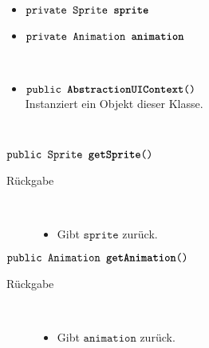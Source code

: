 \begin{description}
\item[Beschreibung] \hfill \\ 
\item[Attribute] \hfill \\
	\vspace{-.8cm}
	\begin{itemize}	
		\item $\texttt{private Sprite \textbf{sprite}}$ \\ 		
		\item $\texttt{private Animation \textbf{animation}}$ \\ 
		\end{itemize}
	
\item[Konstruktoren] \hfill \\
	\vspace{-.8cm}
	\begin{itemize}
		\item $\texttt{public \textbf{AbstractionUIContext}()}$ \\ Instanziert ein Objekt dieser Klasse.

	\end{itemize}
	
\item[Methoden] \hfill \\
	\vspace{-.8cm}
		\item $\texttt{public Sprite \textbf{getSprite}()}$ \\ 
		\begin{description}
			\item[Rückgabe] \hfill \\
			\vspace{-.8cm}
			\begin{itemize}
				\item Gibt $\texttt{sprite}$ zurück.
			\end{itemize}
			\end{description}
			
		\item $\texttt{public Animation \textbf{getAnimation}()}$ \\ 
		\begin{description}
			\item[Rückgabe] \hfill \\
			\vspace{-.8cm}
			\begin{itemize}
				\item Gibt $\texttt{animation}$ zurück.
			\end{itemize}
			\end{description}
			
			
			
	\end{description}	

